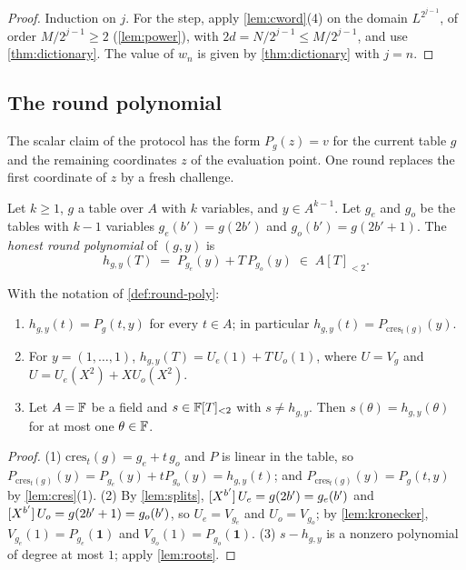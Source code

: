 \begin{proof}
Induction on $j$. For the step, apply \cref{lem:cword}(4) on the domain $L^{2^{j-1}}$, of order $M/2^{j-1} \ge 2$ (\cref{lem:power}), with $2d = N/2^{j-1} \le M/2^{j-1}$, and use \cref{thm:dictionary}. The value of $w_n$ is given by \cref{thm:dictionary} with $j = n$.
\end{proof}

\subsection{The round polynomial}\label{sec:restriction:round}

The scalar claim of the protocol has the form $P_g(z) = v$ for the current table $g$ and the remaining coordinates $z$ of the evaluation point.
One round replaces the first coordinate of $z$ by a fresh challenge.

\begin{definition}\label{def:round-poly}
Let $k \ge 1$, $g$ a table over $A$ with $k$ variables, and $y \in A^{k-1}$.
Let $g_e$ and $g_o$ be the tables with $k-1$ variables $g_e(b') = g(2b')$ and $g_o(b') = g(2b'+1)$.
The \emph{honest round polynomial} of $(g, y)$ is
\[
  h_{g,y}(T) \;=\; P_{g_e}(y) + T\, P_{g_o}(y) \;\in\; A[T]_{<2}.
\]
\end{definition}

\begin{lemma}\label{lem:round-poly}
With the notation of \cref{def:round-poly}:
\begin{enumerate}
  \item $h_{g,y}(t) = P_g(t, y)$ for every $t \in A$; in particular $h_{g,y}(t) = P_{\mathrm{cres}_t(g)}(y)$.
  \item For $y = (1,\dots,1)$, $h_{g,y}(T) = U_e(1) + T\, U_o(1)$, where $U = V_g$ and $U = U_e(X^2) + XU_o(X^2)$.
  \item Let $A = \mathbb{F}$ be a field and $s \in \mathbb{F}[T]_{<2}$ with $s \ne h_{g,y}$. Then $s(\theta) = h_{g,y}(\theta)$ for at most one $\theta \in \mathbb{F}$.
\end{enumerate}
\end{lemma}

\begin{proof}
(1) $\mathrm{cres}_t(g) = g_e + t\, g_o$ and $P$ is linear in the table, so $P_{\mathrm{cres}_t(g)}(y) = P_{g_e}(y) + t P_{g_o}(y) = h_{g,y}(t)$; and $P_{\mathrm{cres}_t(g)}(y) = P_g(t,y)$ by \cref{lem:cres}(1).
(2) By \cref{lem:splits}, $[X^{b'}]\,U_e = g(2b') = g_e(b')$ and $[X^{b'}]\,U_o = g(2b'+1) = g_o(b')$, so $U_e = V_{g_e}$ and $U_o = V_{g_o}$; by \cref{lem:kronecker}, $V_{g_e}(1) = P_{g_e}(\mathbf 1)$ and $V_{g_o}(1) = P_{g_o}(\mathbf 1)$.
(3) $s - h_{g,y}$ is a nonzero polynomial of degree at most $1$; apply \cref{lem:roots}.
\end{proof}

